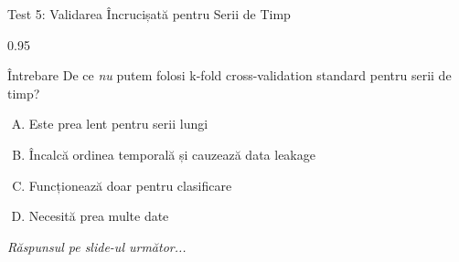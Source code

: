 \documentclass[9pt, aspectratio=169, t]{beamer}
\begin{document}
\begin{frame}{Test 5: Validarea Încrucișată pentru Serii de Timp}
    \begin{cminipage}{0.95\textwidth}
    \begin{alertblock}{Întrebare}
        De ce \emph{nu} putem folosi k-fold cross-validation standard pentru serii de timp?
    \end{alertblock}

    \vspace{0.3cm}

    \begin{enumerate}[A)]\setlength{\itemsep}{0pt}
        \item Este prea lent pentru serii lungi
        \item Încalcă ordinea temporală și cauzează data leakage
        \item Funcționează doar pentru clasificare
        \item Necesită prea multe date
    \end{enumerate}

    \vspace{0.5cm}
    \begin{flushright}\textit{Răspunsul pe slide-ul următor...}\end{flushright}
    \end{cminipage}
\end{frame}
\end{document}
